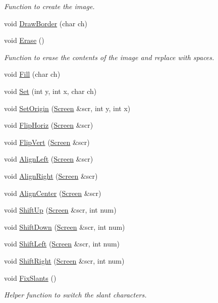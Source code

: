 \begin{DoxyCompactItemize}
\begin{DoxyCompactList}\small\item\em Function to create the image. \end{DoxyCompactList}\item 
void \hyperlink{classImage_a16f8719e59b1180aa7e0e2fdf3e4d421}{Draw\-Border} (char ch)
\item 
\hypertarget{classImage_a118986dafc30b76c4aa5e7453236a8b2}{void \hyperlink{classImage_a118986dafc30b76c4aa5e7453236a8b2}{Erase} ()}\label{classImage_a118986dafc30b76c4aa5e7453236a8b2}

\begin{DoxyCompactList}\small\item\em Function to erase the contents of the image and replace with spaces. \end{DoxyCompactList}\item 
void \hyperlink{classImage_a39486b75d05a1d3c0206a9ce909f3571}{Fill} (char ch)
\item 
void \hyperlink{classImage_a4fbbffe74cd76d884f1e2a96d0bb6c09}{Set} (int y, int x, char ch)
\item 
void \hyperlink{classImage_ab68774143becf8906bf8b1931511cb66}{Set\-Origin} (\hyperlink{classScreen}{Screen} \&scr, int y, int x)
\item 
void \hyperlink{classImage_a3da9cb3d16c05f2037704331dfce2d5d}{Flip\-Horiz} (\hyperlink{classScreen}{Screen} \&scr)
\item 
void \hyperlink{classImage_a72a724415fa05ca58956b84c0985807a}{Flip\-Vert} (\hyperlink{classScreen}{Screen} \&scr)
\item 
void \hyperlink{classImage_a605b3921fed112ffb8a371341c68eb4c}{Align\-Left} (\hyperlink{classScreen}{Screen} \&scr)
\item 
void \hyperlink{classImage_abbb7cdfe276a373ad9b50d5be641eeef}{Align\-Right} (\hyperlink{classScreen}{Screen} \&scr)
\item 
void \hyperlink{classImage_a691da8aebb2d92b7471da96a19e0fc22}{Align\-Center} (\hyperlink{classScreen}{Screen} \&scr)
\item 
void \hyperlink{classImage_afb13957a77e34a87d0991567455a30d5}{Shift\-Up} (\hyperlink{classScreen}{Screen} \&scr, int num)
\item 
void \hyperlink{classImage_aed099dcc3c5113b7171daa35460df948}{Shift\-Down} (\hyperlink{classScreen}{Screen} \&scr, int num)
\item 
void \hyperlink{classImage_abaa7b2fe4eb322156bb14c60d4003ef3}{Shift\-Left} (\hyperlink{classScreen}{Screen} \&scr, int num)
\item 
void \hyperlink{classImage_a1dc60415fb8f71c1c9345382be4ee32f}{Shift\-Right} (\hyperlink{classScreen}{Screen} \&scr, int num)
\item 
\hypertarget{classImage_a5c723d560bde4b6aa45f3eaa36ffb4f2}{void \hyperlink{classImage_a5c723d560bde4b6aa45f3eaa36ffb4f2}{Fix\-Slants} ()}\label{classImage_a5c723d560bde4b6aa45f3eaa36ffb4f2}

\begin{DoxyCompactList}\small\item\em Helper function to switch the slant characters. \end{DoxyCompactList}\end{DoxyCompactItemize}
